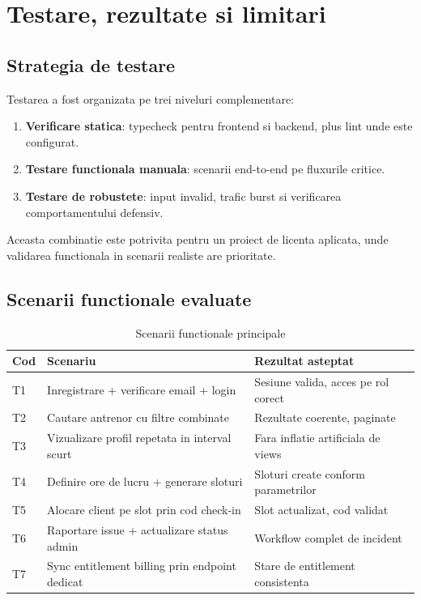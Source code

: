 \chapter{Testare, rezultate si limitari}

\section{Strategia de testare}

Testarea a fost organizata pe trei niveluri complementare:
\begin{enumerate}[leftmargin=1.2cm]
    \item \textbf{Verificare statica}: typecheck pentru frontend si backend, plus lint unde este configurat.
    \item \textbf{Testare functionala manuala}: scenarii end-to-end pe fluxurile critice.
    \item \textbf{Testare de robustete}: input invalid, trafic burst si verificarea comportamentului defensiv.
\end{enumerate}

Aceasta combinatie este potrivita pentru un proiect de licenta aplicata, unde validarea functionala in scenarii realiste are prioritate.

\section{Scenarii functionale evaluate}

\begin{table}[H]
\centering
\caption{Scenarii functionale principale}
\begin{tabular}{p{} p{} p{}}
\toprule
\textbf{Cod} & \textbf{Scenariu} & \textbf{Rezultat asteptat} \\
\midrule
T1 & Inregistrare + verificare email + login & Sesiune valida, acces pe rol corect \\
T2 & Cautare antrenor cu filtre combinate & Rezultate coerente, paginate \\
T3 & Vizualizare profil repetata in interval scurt & Fara inflatie artificiala de views \\
T4 & Definire ore de lucru + generare sloturi & Sloturi create conform parametrilor \\
T5 & Alocare client pe slot prin cod check-in & Slot actualizat, cod validat \\
T6 & Raportare issue + actualizare status admin & Workflow complet de incident \\
T7 & Sync entitlement billing prin endpoint dedicat & Stare de entitlement consistenta \\
\bottomrule
\end{tabular}
\end{table}

